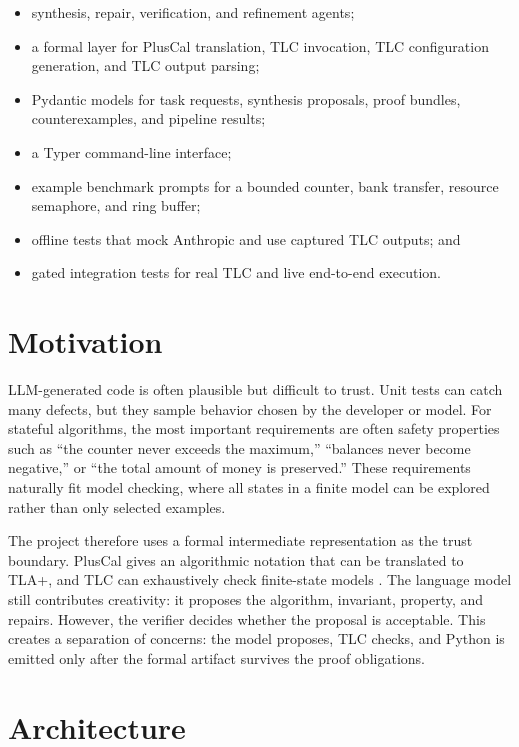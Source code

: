 \documentclass[11pt]{article}
\begin{document}
\begin{itemize}[leftmargin=*]
  \item synthesis, repair, verification, and refinement agents;
  \item a formal layer for PlusCal translation, TLC invocation, TLC
  configuration generation, and TLC output parsing;
  \item Pydantic models for task requests, synthesis proposals, proof bundles,
  counterexamples, and pipeline results;
  \item a Typer command-line interface;
  \item example benchmark prompts for a bounded counter, bank transfer,
  resource semaphore, and ring buffer;
  \item offline tests that mock Anthropic and use captured TLC outputs; and
  \item gated integration tests for real TLC and live end-to-end execution.
\end{itemize}

\section{Motivation}

LLM-generated code is often plausible but difficult to trust. Unit tests can
catch many defects, but they sample behavior chosen by the developer or model.
For stateful algorithms, the most important requirements are often safety
properties such as ``the counter never exceeds the maximum,'' ``balances never
become negative,'' or ``the total amount of money is preserved.'' These
requirements naturally fit model checking, where all states in a finite model
can be explored rather than only selected examples.

The project therefore uses a formal intermediate representation as the trust
boundary. PlusCal gives an algorithmic notation that can be translated to
TLA+, and TLC can exhaustively check finite-state models \cite{lamport2002specifying,
lamport2009pluscal, yu1999model}. The language model still contributes
creativity: it proposes the algorithm, invariant, property, and repairs.
However, the verifier decides whether the proposal is acceptable. This creates
a separation of concerns: the model proposes, TLC checks, and Python is emitted
only after the formal artifact survives the proof obligations.

\section{Architecture}
\end{document}
